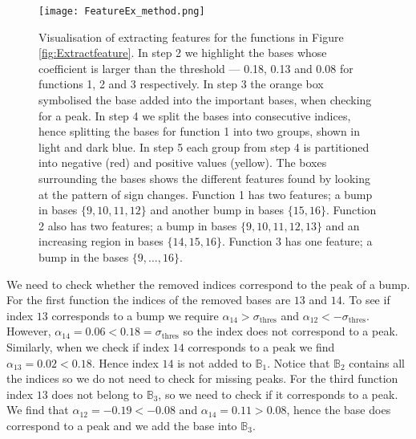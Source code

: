 \documentclass[12pt]{book} %
\begin{document}
     \begin{figure}[t!]
   \hrulefill
   \begin{center} 
    {\texttt{[image: FeatureEx\_method.png]} }
    \end{center}     
    \caption{Visualisation of extracting features for the functions in Figure \ref{fig:Extractfeature}. In step 2 we highlight the bases whose coefficient is larger than the threshold --- 0.18, 0.13 and 0.08 for functions 1, 2 and 3 respectively. In step 3 the orange box symbolised the base added into the important bases, when checking for a peak. In step 4 we split the bases into consecutive indices, hence splitting the bases for function 1 into two groups, shown in light and dark blue. In step 5 each group from step 4 is partitioned into negative (red) and positive values (yellow). The boxes surrounding the bases shows the different features found by looking at the pattern of sign changes. Function 1 has two features; a bump in bases $\{9,10,11,12\}$ and another bump in bases $\{15,16\}$. Function 2 also has two features; a bump in bases $\{9,10,11,12,13\}$ and an increasing region in bases $\{14,15,16\}$. Function 3 has one feature; a bump in the bases $\{9, \dots, 16\}$.}
    \label{fig:tableFeatures}
    \hrulefill
    \end{figure}
  
  We need to check whether the removed indices correspond to the peak of a bump. For the first function the indices of the removed bases are $13$ and $14$. To see if index $13$ corresponds to a bump we require $\alpha_{14} > \sigma_{\mathrm{thres}}$ and $\alpha_{12} < -\sigma_{\mathrm{thres}}$. However, $\alpha_{14} = 0.06 < 0.18 = \sigma_{\mathrm{thres}}$ so the index does not correspond to a peak. Similarly, when we check if index $14$ corresponds to a peak we find  $\alpha_{13} =0.02 < 0.18$. Hence index $14$ is not added to $\mathbb{B}_1$. Notice that $\mathbb{B}_2$ contains all the indices so we do not need to check for missing peaks. For the third function index $13$ does not belong to $\mathbb{B}_3$, so we need to check if it corresponds to a peak. We find that $\alpha_{12} =-0.19 < -0.08$ and $\alpha_{14} =0.11 > 0.08$, hence the base does correspond to a peak and we add the base into $\mathbb{B}_3$.
  
  
\end{document}
